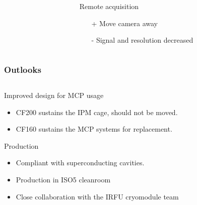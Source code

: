 \begin{frame}
\begin{columns}[T]
\begin{column}{0.60\textwidth}
    \end{column}
    \begin{column}{0.35\textwidth}
      \begin{block}{Remote acquisition}
        \begin{itemize}
          \item[+] Move camera away
          \item[-] Signal and resolution decreased
        \end{itemize}
      \end{block}
    \end{column}
  \end{columns}
\end{frame}

\begin{frame}
  \frametitle{Outlooks}
  \begin{columns}[T]
    \begin{column}{0.45\textwidth}
      \begin{block}{Improved design for MCP usage}
        \begin{itemize}
          \item CF200 sustains the IPM cage, should not be moved.
          \item CF160 sustains the MCP systems for replacement.
        \end{itemize}
      \end{block}
      \begin{block}{Production}
        \begin{itemize}
          \item Compliant with superconducting cavities.
          \item Production in ISO5 cleanroom
          \item Close collaboration with the IRFU cryomodule team
        \end{itemize}
      \end{block}
    \end{column}
    \begin{column}{0.45\textwidth}

\end{column}
\end{columns}
\end{frame}
